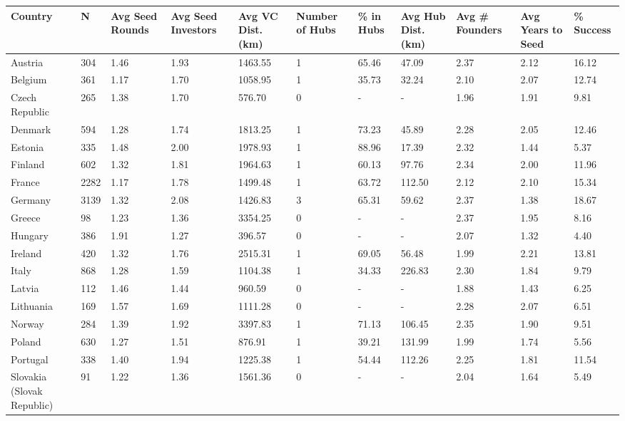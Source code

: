 \begin{tabular}{lllllllllll}
  \toprule
Country & N & Avg Seed Rounds & Avg Seed Investors & Avg VC Dist. (km) & Number of Hubs & \% in Hubs & Avg Hub Dist. (km) & Avg \# Founders & Avg Years to Seed & \% Success \\ 
  \midrule
Austria & 304 & 1.46 & 1.93 & 1463.55 & 1 & 65.46 & 47.09 & 2.37 & 2.12 & 16.12 \\ 
  Belgium & 361 & 1.17 & 1.70 & 1058.95 & 1 & 35.73 & 32.24 & 2.10 & 2.07 & 12.74 \\ 
  Czech Republic & 265 & 1.38 & 1.70 & 576.70 & 0 & - & - & 1.96 & 1.91 & 9.81 \\ 
  Denmark & 594 & 1.28 & 1.74 & 1813.25 & 1 & 73.23 & 45.89 & 2.28 & 2.05 & 12.46 \\ 
  Estonia & 335 & 1.48 & 2.00 & 1978.93 & 1 & 88.96 & 17.39 & 2.32 & 1.44 & 5.37 \\ 
  Finland & 602 & 1.32 & 1.81 & 1964.63 & 1 & 60.13 & 97.76 & 2.34 & 2.00 & 11.96 \\ 
  France & 2282 & 1.17 & 1.78 & 1499.48 & 1 & 63.72 & 112.50 & 2.12 & 2.10 & 15.34 \\ 
  Germany & 3139 & 1.32 & 2.08 & 1426.83 & 3 & 65.31 & 59.62 & 2.37 & 1.38 & 18.67 \\ 
  Greece & 98 & 1.23 & 1.36 & 3354.25 & 0 & - & - & 2.37 & 1.95 & 8.16 \\ 
  Hungary & 386 & 1.91 & 1.27 & 396.57 & 0 & - & - & 2.07 & 1.32 & 4.40 \\ 
  Ireland & 420 & 1.32 & 1.76 & 2515.31 & 1 & 69.05 & 56.48 & 1.99 & 2.21 & 13.81 \\ 
  Italy & 868 & 1.28 & 1.59 & 1104.38 & 1 & 34.33 & 226.83 & 2.30 & 1.84 & 9.79 \\ 
  Latvia & 112 & 1.46 & 1.44 & 960.59 & 0 & - & - & 1.88 & 1.43 & 6.25 \\ 
  Lithuania & 169 & 1.57 & 1.69 & 1111.28 & 0 & - & - & 2.28 & 2.07 & 6.51 \\ 
  Norway & 284 & 1.39 & 1.92 & 3397.83 & 1 & 71.13 & 106.45 & 2.35 & 1.90 & 9.51 \\ 
  Poland & 630 & 1.27 & 1.51 & 876.91 & 1 & 39.21 & 131.99 & 1.99 & 1.74 & 5.56 \\ 
  Portugal & 338 & 1.40 & 1.94 & 1225.38 & 1 & 54.44 & 112.26 & 2.25 & 1.81 & 11.54 \\ 
  Slovakia (Slovak Republic) & 91 & 1.22 & 1.36 & 1561.36 & 0 & - & - & 2.04 & 1.64 & 5.49 \\ 

\end{tabular}
